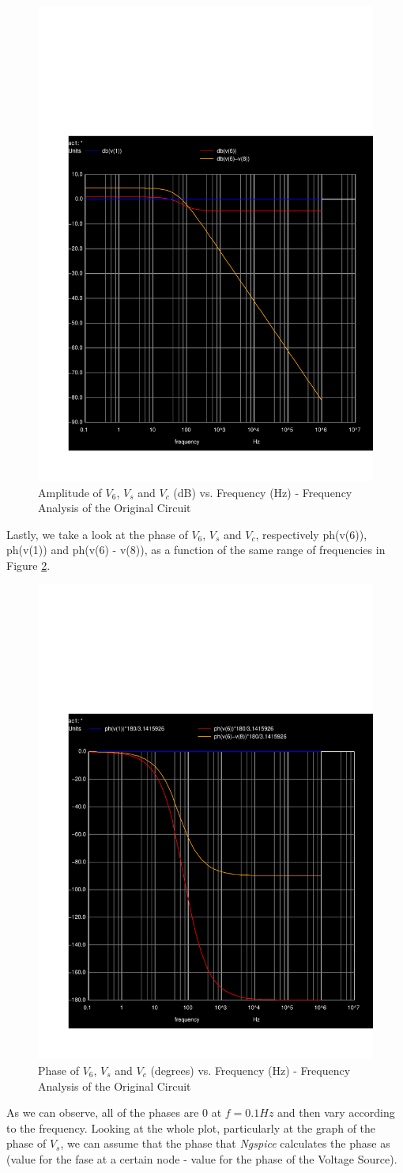  

\begin{figure}[h] \centering
\includegraphics[width=0.4\linewidth]{../sim/db.pdf}
\caption{Amplitude of $V_6$, $V_s$ and $V_c$ (dB) vs. Frequency (Hz) - Frequency Analysis of the Original Circuit}
\label{fig:sim-graph5db}
\end{figure}

Lastly, we take a look at the phase of $V_6$, $V_s$ and $V_c$, respectively ph(v(6)), ph(v(1)) and ph(v(6) - v(8)), as a function of the same range of frequencies in Figure \ref{fig:sim-graph5ph}.

\begin{figure}[h] \centering
\includegraphics[width=0.4\linewidth]{../sim/ph.pdf}
\caption{Phase of $V_6$, $V_s$ and $V_c$ (degrees) vs. Frequency (Hz) - Frequency Analysis of the Original Circuit}
\label{fig:sim-graph5ph}
\end{figure}

As we can observe, all of the phases are 0 at $f=0.1Hz$ and then vary according to the frequency. Looking at the whole plot, particularly at the graph of the phase of $V_s$, we can assume that the phase that \textit{Ngspice} calculates the phase as (value for the fase at a certain node - value for the phase of the Voltage Source).